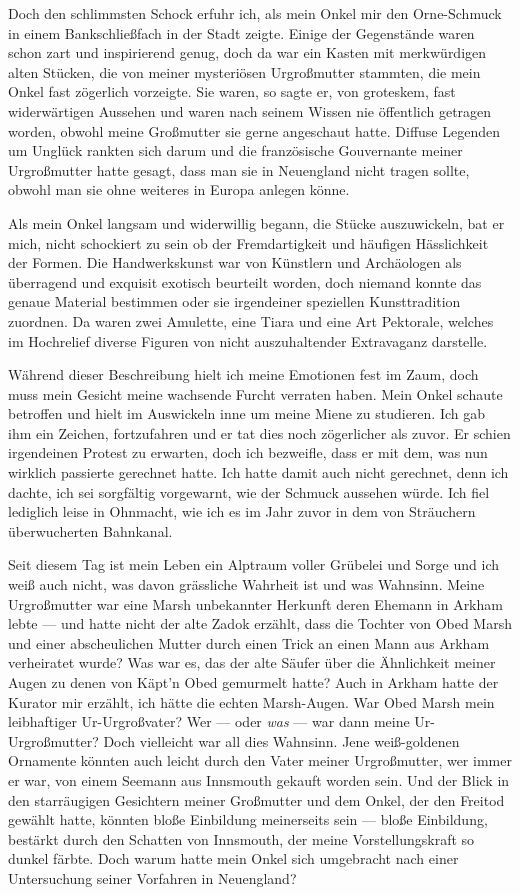 Doch den schlimmsten Schock erfuhr ich, als mein Onkel mir den Orne-Schmuck in einem Bankschließfach in der Stadt zeigte. Einige der Gegenstände waren schon zart und inspirierend genug, doch da war ein Kasten mit merkwürdigen alten Stücken, die von meiner mysteriösen Urgroßmutter stammten, die mein Onkel fast zögerlich vorzeigte. Sie waren, so sagte er, von groteskem, fast widerwärtigen Aussehen und waren nach seinem Wissen nie öffentlich getragen worden, obwohl meine Großmutter sie gerne angeschaut hatte. Diffuse Legenden um Unglück rankten sich darum und die französische Gouvernante meiner Urgroßmutter hatte gesagt, dass man sie in Neuengland nicht tragen sollte, obwohl man sie ohne weiteres in Europa anlegen könne.

Als mein Onkel langsam und widerwillig begann, die Stücke auszuwickeln, bat er mich, nicht schockiert zu sein ob der Fremdartigkeit und häufigen Hässlichkeit der Formen. Die Handwerkskunst war von Künstlern und Archäologen als überragend und exquisit exotisch beurteilt worden, doch niemand konnte das genaue Material bestimmen oder sie irgendeiner speziellen Kunsttradition zuordnen. Da waren zwei Amulette, eine Tiara und eine Art Pektorale, welches im Hochrelief diverse Figuren von nicht auszuhaltender Extravaganz darstelle.

Während dieser Beschreibung hielt ich meine Emotionen fest im Zaum, doch muss mein Gesicht meine wachsende Furcht verraten haben. Mein Onkel schaute betroffen und hielt im Auswickeln inne um meine Miene zu studieren. Ich gab ihm ein Zeichen, fortzufahren und er tat dies noch zögerlicher als zuvor. Er schien irgendeinen Protest zu erwarten, doch ich bezweifle, dass er mit dem, was nun wirklich passierte gerechnet hatte. Ich hatte damit auch nicht gerechnet, denn ich dachte, ich sei sorgfältig vorgewarnt, wie der Schmuck aussehen würde. Ich fiel lediglich leise in Ohnmacht, wie ich es im Jahr zuvor in dem von Sträuchern überwucherten Bahnkanal.

Seit diesem Tag ist mein Leben ein Alptraum voller Grübelei und Sorge und ich weiß auch nicht, was davon grässliche Wahrheit ist und was Wahnsinn. Meine Urgroßmutter war eine Marsh unbekannter Herkunft deren Ehemann in Arkham lebte --- und hatte nicht der alte Zadok erzählt, dass die Tochter von Obed Marsh und einer abscheulichen Mutter durch einen Trick an einen Mann aus Arkham verheiratet wurde? Was war es, das der alte Säufer über die Ähnlichkeit meiner Augen zu denen von Käpt'n Obed gemurmelt hatte? Auch in Arkham hatte der Kurator mir erzählt, ich hätte die echten Marsh-Augen. War Obed Marsh mein leibhaftiger Ur-Urgroßvater? Wer --- oder \textit{was} --- war dann meine Ur-Urgroßmutter? Doch vielleicht war all dies Wahnsinn. Jene weiß-goldenen Ornamente könnten auch leicht durch den Vater meiner Urgroßmutter, wer immer er war, von einem Seemann aus Innsmouth gekauft worden sein. Und der Blick in den starräugigen Gesichtern meiner Großmutter  und dem Onkel, der den Freitod gewählt hatte, könnten bloße Einbildung meinerseits sein --- bloße Einbildung, bestärkt durch den Schatten von Innsmouth, der meine Vorstellungskraft so dunkel färbte. Doch warum hatte mein Onkel sich umgebracht nach einer Untersuchung seiner Vorfahren in Neuengland?

